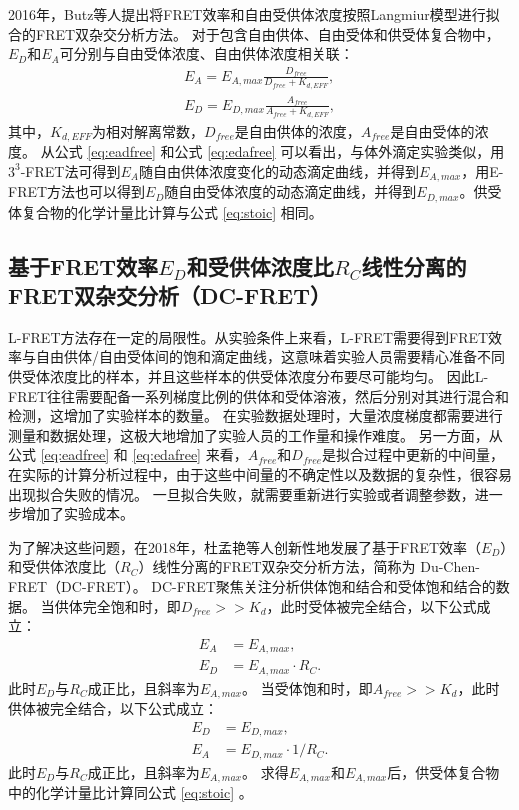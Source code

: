 2016年，Butz等人提出将FRET效率和自由受供体浓度按照Langmiur模型进行拟合的FRET双杂交分析方法。
对于包含自由供体、自由受体和供受体复合物中，$E_D$和$E_A$可分别与自由受体浓度、自由供体浓度相关联：
\begin{align}
    E_A = E_{A,max} \frac{D_{free}}{D_{free}+K_{d,EFF}}, \label{eq:eadfree} \\
    E_D = E_{D,max} \frac{A_{free}}{A_{free}+K_{d,EFF}}, \label{eq:edafree}
\end{align}
其中，$K_{d,EFF}$为相对解离常数，$D_{free}$是自由供体的浓度，$A_{free}$是自由受体的浓度。
从公式 \ref{eq:eadfree} 和公式 \ref{eq:edafree} 可以看出，与体外滴定实验类似，用$3^3$-FRET法可得到$E_A$随自由供体浓度变化的动态滴定曲线，并得到$E_{A,max}$，用E-FRET方法也可以得到$E_D$随自由受体浓度的动态滴定曲线，并得到$E_{D,max}$。供受体复合物的化学计量比计算与公式 \ref{eq:stoic} 相同。

\subsection{\texorpdfstring{基于FRET效率$E_D$和受供体浓度比$R_C$线性分离的FRET双杂交分析（DC-FRET）}{基于FRET效率Ed和受供体浓度比Rc线性分离的FRET双杂交分析（DC-FRET）}}

L-FRET方法存在一定的局限性。从实验条件上来看，L-FRET需要得到FRET效率与自由供体/自由受体间的饱和滴定曲线，这意味着实验人员需要精心准备不同供受体浓度比的样本，并且这些样本的供受体浓度分布要尽可能均匀。
因此L-FRET往往需要配备一系列梯度比例的供体和受体溶液，然后分别对其进行混合和检测，这增加了实验样本的数量。
在实验数据处理时，大量浓度梯度都需要进行测量和数据处理，这极大地增加了实验人员的工作量和操作难度。
另一方面，从公式 \ref{eq:eadfree} 和 \ref{eq:edafree} 来看，$A_{free}$和$D_{free}$是拟合过程中更新的中间量，在实际的计算分析过程中，由于这些中间量的不确定性以及数据的复杂性，很容易出现拟合失败的情况。
一旦拟合失败，就需要重新进行实验或者调整参数，进一步增加了实验成本。

为了解决这些问题，在2018年，杜孟艳等人创新性地发展了基于FRET效率（$E_D$）和受供体浓度比（$R_C$）线性分离的FRET双杂交分析方法，简称为 Du-Chen-FRET（DC-FRET）。
DC-FRET聚焦关注分析供体饱和结合和受体饱和结合的数据。
当供体完全饱和时，即$D_{free}>>K_d$，此时受体被完全结合，以下公式成立：
\begin{align} 
    E_A &= E_{A,max}, \label{eq:ea_appro} \\
    E_D &= {E_{A,max}}{\cdot}{R_C}. \label{eq:ea_slope}
\end{align}
此时$E_D$与$R_C$成正比，且斜率为$E_{A,max}$。
当受体饱和时，即$A_{free}>>K_d$，此时供体被完全结合，以下公式成立：
\begin{align}
    E_D &= E_{D,max}, \label{eq:ed_appro} \\
    E_A &= E_{D,max}{\cdot}{1/R_C}. \label{eq:ed_slope}
\end{align}
此时$E_D$与$R_C$成正比，且斜率为$E_{A,max}$。
求得$E_{A,max}$和$E_{A,max}$后，供受体复合物中的化学计量比计算同公式 \ref{eq:stoic} 。

